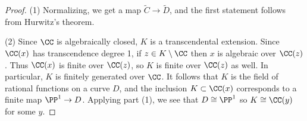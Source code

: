 \begin{proof}
\noindent (1) Normalizing, we get a map  $ \tilde C \to \tilde D$, and
the first statement follows from 
Hurwitz's theorem.
%

\smallbreak

\noindent (2) Since $\CC$ is algebraically closed, 
$K$ is a 
transcendental extension.
%
\vadjust{\allowbreak}%
Since $\CC(x)$ has
transcendence degree 1, if $z\in K\setminus \CC$
then $x$ is algebraic over $\CC(z)$. Thus $\CC(x)$ is finite over $\CC(z)$, so $K$ is finite over $\CC(z)$
as well. In particular, $K$ is finitely generated over $\CC$. It follows that $K$ is the field of rational functions
on a curve $D$, and the inclusion $K\subset \CC(x)$ corresponds to a finite map $\PP^1\to D$. Applying
part (1),
we see that $D\cong \PP^1$ so $K \cong \CC(y)$ for some $y$.
\end{proof}
 
